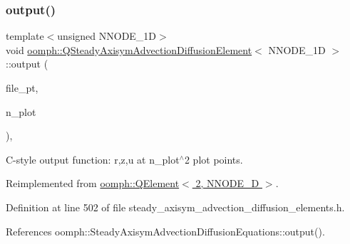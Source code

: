 \subsubsection{\texorpdfstring{output()}{output()}\hspace{0.1cm}{\footnotesize\ttfamily [4/4]}}
{\footnotesize\ttfamily template$<$unsigned N\+N\+O\+D\+E\+\_\+1D$>$ \\
void \hyperlink{classoomph_1_1QSteadyAxisymAdvectionDiffusionElement}{oomph\+::\+Q\+Steady\+Axisym\+Advection\+Diffusion\+Element}$<$ N\+N\+O\+D\+E\+\_\+1D $>$\+::output (\begin{DoxyParamCaption}\item[{F\+I\+LE $\ast$}]{file\+\_\+pt,  }\item[{const unsigned \&}]{n\+\_\+plot }\end{DoxyParamCaption})\hspace{0.3cm}{\ttfamily [inline]}, {\ttfamily [virtual]}}



C-\/style output function\+: r,z,u at n\+\_\+plot$^\wedge$2 plot points. 



Reimplemented from \hyperlink{classoomph_1_1QElement_3_012_00_01NNODE__1D_01_4_aeaa407209398e3c0daf6968520d774ec}{oomph\+::\+Q\+Element$<$ 2, N\+N\+O\+D\+E\+\_\+D $>$}.



Definition at line 502 of file steady\+\_\+axisym\+\_\+advection\+\_\+diffusion\+\_\+elements.\+h.



References oomph\+::\+Steady\+Axisym\+Advection\+Diffusion\+Equations\+::output().

\mbox{\label{classoomph_1_1QSteadyAxisymAdvectionDiffusionElement_a6f21bbd8825931be66be210cea87000d}} 
